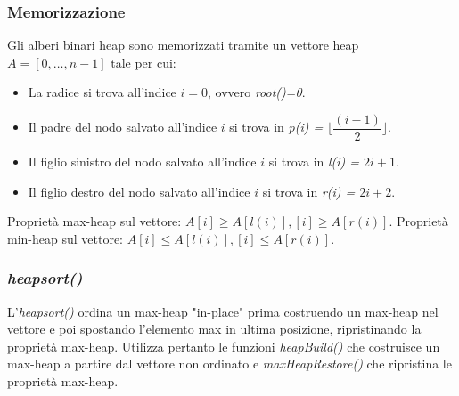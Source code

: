 \subsubsection{Memorizzazione}
Gli alberi binari heap sono memorizzati tramite un vettore heap $A=[0, \dots, n-1]$ tale per cui: 
\begin{itemize}
\item La radice si trova all'indice $i=0$, ovvero \emph{root()=0}.
\item Il padre del nodo salvato all'indice $i$ si trova in \emph{p(i) = $\lfloor\dfrac{(i-1)}{2} \rfloor$}.
\item Il figlio sinistro del nodo salvato all'indice $i$ si trova in \emph{l(i) = $2i+1$}.
\item Il figlio destro del nodo salvato all'indice $i$ si trova in \emph{r(i) = $2i+2$}.
\end{itemize}
Propriet\`a max-heap sul vettore: $A[i]\ge A[l(i)], [i]\ge A[r(i)]$. Propriet\`a min-heap sul vettore: $A[i]\le A[l(i)], [i]\le A[r(i)]$.
\subsubsection{\emph{heapsort()}}
L'\emph{heapsort()} ordina un max-heap "in-place" prima costruendo un max-heap nel vettore e poi spostando l'elemento max in ultima posizione, ripristinando
la propriet\`a max-heap. Utilizza pertanto le funzioni \emph{heapBuild()} che costruisce un max-heap a partire dal vettore non ordinato e \emph{ 
maxHeapRestore()} che ripristina le propriet\`a max-heap.
